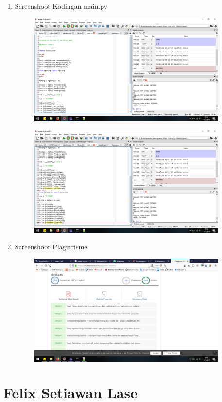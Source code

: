 \begin{enumerate}
\item Screenshoot Kodingan main.py
\begin{figure}[H]
	\includegraphics[width=10cm]{figures/diva/Chapter3/main_1.png}
	\centering
\end{figure}
\begin{figure}[H]
	\includegraphics[width=10cm]{figures/diva/Chapter3/main_2.png}
	\centering
\end{figure}

\item Screenshoot Plagiarisme
\begin{figure}[H]
	\includegraphics[width=10cm]{figures/diva/Chapter3/plagiarisme.png}
	\centering
\end{figure}
\end{enumerate}
\section{Felix Setiawan Lase}
